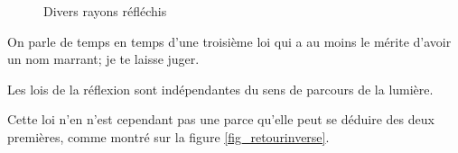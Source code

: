\begin{figure}[ht]
\centering

%
%
%
%
%
%
\caption{Divers rayons réfléchis}\label{fig_reflexion}
\end{figure}


On parle de temps en temps d'une troisième loi qui a au moins le mérite d'avoir un nom marrant; je te laisse juger. 

\begin{loiphyz}
Les lois de la réflexion sont indépendantes du sens de parcours de la lumière.
\end{loiphyz}
 
Cette loi n'en n'est cependant pas une parce qu'elle peut se déduire des deux premières, comme montré sur la figure \ref{fig_retourinverse}.

\newcommand{\prefigretourinverse}{%
			
\pstGeonode(0,0){O}(2,0){P}
\pstRotation[RotAngle=90]{O}{P}[Qi]
\pstHomO[HomCoef=0.5]{O}{Qi}[Q]
\pstRotation[RotAngle=180]{O}{P}[R]
\pstHomO[HomCoef=-1]{O}{Q}[S]
\pstRotation[RotAngle=-40]{O}{R}[Ri]		%
    \pstDioptre{O}{P}{Ri}{0.9}{2}{Rs}{Re}	%
}

